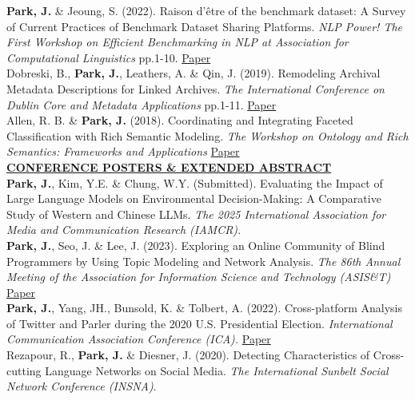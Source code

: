 \documentclass{article}
\begin{document}
\noindent \textbf{Park, J.} \& Jeoung, S. (2022). Raison d'être of the benchmark dataset: A Survey of Current Practices of Benchmark Dataset Sharing Platforms. \textit{NLP Power! The First Workshop on Efficient Benchmarking in NLP at Association for Computational Linguistics} pp.1-10. \hfill \href{https://aclanthology.org/2022.nlppower-1.1/}{Paper} \\

\noindent Dobreski, B., \textbf{Park, J.}, Leathers, A. \& Qin, J. (2019). Remodeling Archival Metadata Descriptions for Linked Archives. \textit{The International Conference on Dublin Core and Metadata Applications} pp.1-11. \hfill \href{https://dcpapers.dublincore.org/article/952141553}{Paper} \\ 

\noindent Allen, R. B. \& \textbf{Park, J.} (2018). Coordinating and Integrating Faceted Classification with Rich Semantic Modeling. \textit{The Workshop on Ontology and Rich Semantics: Frameworks and Applications} \hfill \href{https://arxiv.org/abs/1809.09548}{Paper} \\

\noindent \textbf{\underline{CONFERENCE POSTERS \& EXTENDED ABSTRACT}} \\
\noindent \textbf{Park, J.}, Kim, Y.E. \& Chung, W.Y. (Submitted). Evaluating the Impact of Large Language Models on Environmental Decision-Making: A Comparative Study of Western and Chinese LLMs. \textit{The 2025 International Association for Media and Communication Research (IAMCR).} \\  

\noindent \textbf{Park, J.}, Seo, J. \& Lee, J. (2023). Exploring an Online Community of Blind Programmers by Using Topic Modeling and Network Analysis. \textit{The 86th Annual Meeting of the Association for Information Science and Technology (ASIS\&T)} \hfill \href{https://doi.org/10.1002/pra2.956}{Paper} \\

\noindent \textbf{Park, J.}, Yang, JH., Bunsold, K. \& Tolbert, A. (2022). Cross-platform Analysis of Twitter and Parler during the 2020 U.S. Presidential Election. \textit{International Communication Association Conference (ICA).} \hfill \href{https://www.ideals.illinois.edu/items/121292}{Paper} \\ 

\noindent Rezapour, R., \textbf{Park, J.} \& Diesner, J. (2020). Detecting Characteristics of Cross-cutting Language Networks on Social Media. \textit{The International Sunbelt Social Network Conference (INSNA)}. \\
\end{document}
